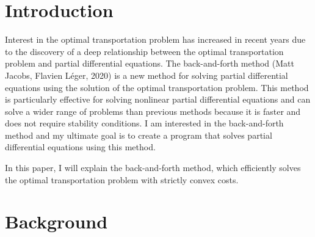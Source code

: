 \documentclass[a4j,10pt, twocolumn, dvipdfmx]{article}
\theoremstyle{definition}
\begin{document}

\section{Introduction}

Interest in the optimal transportation problem has increased in recent years due to the discovery of a deep relationship between the optimal transportation problem and partial differential equations.
The back-and-forth method (Matt Jacobs, Flavien Léger, 2020) is a new method for solving partial differential equations using the solution of the optimal transportation problem. 
This method is particularly effective for solving nonlinear partial differential equations and can solve a wider range of problems than previous methods because it is faster and does not require stability conditions. 
I am interested in the back-and-forth method and my ultimate goal is to create a program that solves partial differential equations using this method. 

In this paper, I will explain the back-and-forth method, which efficiently solves the optimal transportation problem with strictly convex costs.

\section{Background}
\end{document}

